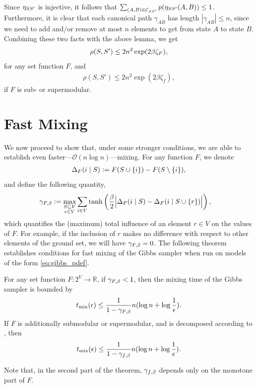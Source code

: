 Since $\eta_{SS'}$ is injective, it follows that $\sum_{(A, B) \in \mathcal{C}_{SS'}} p(\eta_{SS'}(A, B)) \leq 1$.
Furthermore, it is clear that each canonical path $\gamma_{AB}$ has length $|\gamma_{AB}| \leq n$, since we need to add and/or remove at most $n$ elements to get from state $A$ to state $B$.
Combining these two facts with the above lemma, we get
\begin{align*}
  \rho(S, S') \leq 2n^2 \exp(2 \beta \zeta_F),
\end{align*}
for any set function $F$, and
\begin{align*}
  \rho(S, S') \leq 2n^2 \exp(2 \beta \zeta_f),
\end{align*}
if $F$ is sub- or supermodular.


\section{Fast Mixing}
We now proceed to show that, under some stronger conditions, we are able to establish even faster---$\mathcal{O}(n \log n)$---mixing.
For any function $F$, we denote
\begin{align*}
\Delta_F(i\mid S) \vcentcolon= F(S \cup \{i\}) - F(S \setminus \{i\}),
\end{align*}
and define the following quantity,
\begin{align*}
  \gamma_{F,\beta} &\vcentcolon= \max_{\substack{S \subseteq V\\r \in V}} \sum_{\substack{i \in V}} \tanh\left(\frac{\beta}{2} \Big|\Delta_F(i\mid S) - \Delta_F(i\mid S \cup \{r\})\Big| \right),
\end{align*}
which quantifies the (maximum) total influence of an element $r \in V$ on the values of $F$.
For example, if the inclusion of $r$ makes no difference with respect to other elements of the ground set, we will have $\gamma_{F,\beta} = 0$.
The following theorem establishes conditions for fast mixing of the Gibbs sampler when run on models of the form \eqref{eq:gibbs_pdef}.

\begin{theorem} \label{thm:fast}
  For any set function $F : 2^V \to \mathbb{R}$, if $\gamma_{F,\beta} < 1$, then the mixing time of the Gibbs sampler is bounded by
  \begin{align*}
  	t_{\mathrm{mix}}(\epsilon) \leq \frac{1}{1 - \gamma_{F,\beta}}n(\log n + \log \frac{1}{\epsilon}).
  \end{align*}
  If $F$ is additionally submodular or supermodular, and is decomposed according to , then
  \begin{align*}
  	t_{\mathrm{mix}}(\epsilon) \leq \frac{1}{1 - \gamma_{f,\beta}}n(\log n + \log \frac{1}{\epsilon}).
  \end{align*}
\end{theorem}
Note that, in the second part of the theorem, $\gamma_{f,\beta}$ depends only on the monotone part of $F$. 

